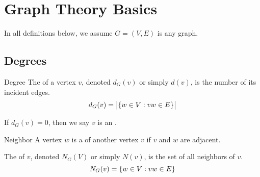 \documentclass{styles/tufte}
\author{Jiaming (George) Yu}
\date{\today}
\begin{document}
\maketitle
\tableofcontents
\newpage



\section{Graph Theory Basics}

In all definitions below, we assume $G = (V, E)$ is any graph.

\subsection{Degrees}

\begin{definition}{Degree}{}
  The  of a vertex $v$, denoted $d_G(v)$ or simply $d(v)$, is the number of its incident edges.
  \[ d_G(v) = \card{\set{w \in V: vw \in E}} \]
  
  If $d_G(v) = 0$, then we say $v$ is an .
\end{definition}

\begin{definition}{Neighbor}{}
  A vertex $w$ is a  of another vertex $v$ if $v$ and $w$ are adjacent.
  
  The  of $v$, denoted $N_G(V)$ or simply $N(v)$, is the set of all neighbors of $v$.
  \[ N_G(v) = \set{w \in V: vw \in E} \]
\end{definition}

\begin{definition}
  
\end{definition}
\end{document}
